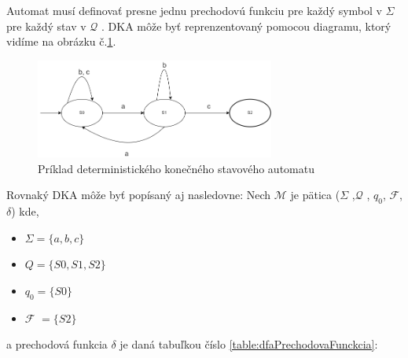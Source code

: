 Automat musí definovať presne jednu prechodovú funkciu pre každý symbol v $\Sigma$ pre každý stav v $\mathcal{Q}$ \cite{FiniteStateMachines}.
DKA môže byť reprenzentovaný pomocou diagramu, ktorý vidíme na obrázku č.\ref{figure:dfa1}.

\newpage

\begin{figure}[!h]
    \centering
    \includegraphics[width=0.70\textwidth]{img/dfa.png}
    \caption{Príklad deterministického konečného stavového automatu}
    \label{figure:dfa1}
\end{figure}

Rovnaký DKA môže byť popísaný aj nasledovne:
Nech $\mathcal{M}$ je pätica ($\Sigma$ ,$\mathcal{Q}$ , $q_0$, $\mathcal{F}$, $\delta$) kde,

\begin{itemize}
    \item \begin{math} \Sigma = \{a, b ,c \}  \end{math}
    \item \begin{math} Q = \{S0, S1, S2 \}  \end{math}
    \item \begin{math} q_0 = \{S0 \}  \end{math}
    \item $\mathcal{F}$ \begin{math} = \{S2\}  \end{math}
\end{itemize}
a prechodová funkcia $\delta$ je daná tabuľkou číslo \ref{table:dfaPrechodovaFunckcia}:

